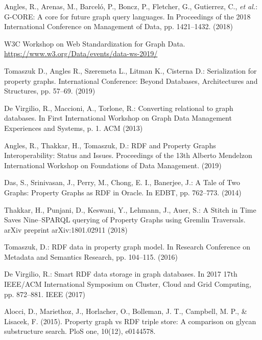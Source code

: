 \documentclass[runningheads]{llncs}
\begin{document}
\begin{thebibliography}{8}
Angles, R., Arenas, M., Barceló, P., Boncz, P., Fletcher, G., Gutierrez, C., {\itshape et al.}: G-CORE: A core for future graph query languages. In Proceedings of the 2018 International Conference on Management of Data, pp. 1421--1432. (2018)

W3C Workshop on Web Standardization for Graph Data. \url{https://www.w3.org/Data/events/data-ws-2019/}

Tomaszuk D., Angles R., Szeremeta L., Litman K., Cisterna D.:
Serialization for property graphs. International Conference: Beyond Databases, Architectures and Structures, pp. 57--69. (2019)

De Virgilio, R., Maccioni, A., Torlone, R.: Converting relational to graph databases. In First International Workshop on Graph Data Management Experiences and Systems, p. 1. ACM (2013)

Angles, R., Thakkar, H., Tomaszuk, D.: RDF and Property Graphs Interoperability: Status and Issues. Proceedings of the 13th Alberto Mendelzon International Workshop on Foundations of Data Management. (2019)

Das, S., Srinivasan, J., Perry, M., Chong, E. I., Banerjee, J.: A Tale of Two Graphs: Property Graphs as RDF in Oracle. In EDBT, pp. 762--773. (2014)

Thakkar, H., Punjani, D., Keswani, Y., Lehmann, J., Auer, S.: A Stitch in Time Saves Nine--SPARQL querying of Property Graphs using Gremlin Traversals. arXiv preprint arXiv:1801.02911 (2018)

Tomaszuk, D.: RDF data in property graph model. In Research Conference on Metadata and Semantics Research, pp. 104--115. (2016)

De Virgilio, R.: Smart RDF data storage in graph databases. In 2017 17th IEEE/ACM International Symposium on Cluster, Cloud and Grid Computing, pp. 872--881. IEEE (2017)

Alocci, D., Mariethoz, J., Horlacher, O., Bolleman, J. T., Campbell, M. P., & Lisacek, F. (2015). Property graph vs RDF triple store: A comparison on glycan substructure search. PloS one, 10(12), e0144578.






\end{thebibliography}
\end{document}
